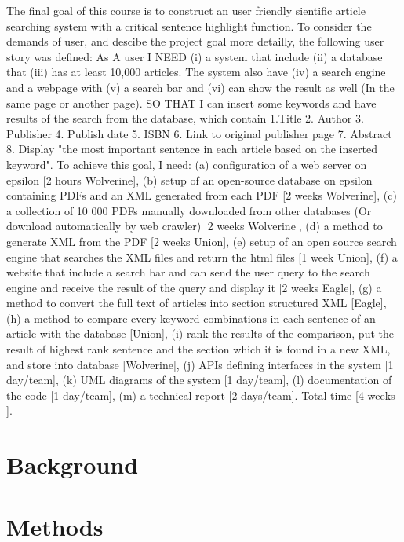 \documentclass[a4paper,twocolumn,twoside]{article}
\begin{document}
	The final goal of this course is to construct an user friendly sientific article searching system with a critical sentence highlight function.
	To consider the demands of user, and descibe the project goal more detailly, the following user story was defined:  
	As A user I NEED (i) a system that include (ii) a database that (iii) has at least 10,000 articles.
	The system also have (iv) a search engine and a webpage with (v) a search bar and (vi) can show the result as well (In the same page or another page).
	SO THAT I can insert some keywords and have results of the search from the database, which contain 1.Title 2. Author 3. Publisher 4. Publish date 5. ISBN 6. Link to original publisher page 7. Abstract 8. Display "the most important sentence in each article based on the inserted keyword".
	To achieve this goal, I need:
	(a) configuration of a web server on epsilon [2 hours Wolverine],
	(b) setup of an open-source database on epsilon containing PDFs and an XML generated from each PDF [2 weeks Wolverine],
	(c) a collection of 10 000 PDFs manually downloaded from other databases (Or download automatically by web crawler) [2 weeks Wolverine],
	(d) a method to generate XML from the PDF [2 weeks Union],
	(e) setup of an open source search engine that searches the XML files and return the html files [1 week Union],
	(f) a website that include a search bar and can send the user query to the search engine and receive the result of the query and display it [2 weeks Eagle],
	(g) a method to convert the full text of articles into section structured XML [Eagle],
	(h) a method to compare every keyword combinations in each sentence of an article with the database [Union],
	(i) rank the results of the comparison, put the result of highest rank sentence and the section which it is found in a new XML, and store into database [Wolverine],
	(j) APIs defining interfaces in the system [1 day/team], 
	(k) UML diagrams of the system [1 day/team],
	(l) documentation of the code [1 day/team], (m) a technical report [2 days/team]. Total time [4 weeks ].
		
	\section{Background}
	\label{Background}

	
	
	

	\section{Methods}
	\label{Methods}
	
\end{document}
